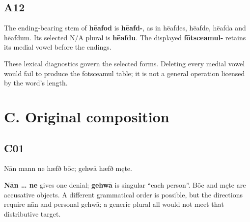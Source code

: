 \subsection*{A12}

\par\begin{minipage}{\linewidth}\raggedright
The ending-bearing stem of \textbf{hēafod} is \textbf{hēafd-}, as in hēafdes, hēafde, hēafda and hēafdum. Its selected N/\allowbreak{}A plural is \textbf{hēafdu}. The displayed \textbf{fōtsceamul-} retains its medial vowel before the endings.

These lexical diagnostics govern the selected forms. Deleting every medial vowel would fail to produce the fōtsceamul table; it is not a general operation licensed by the word’s length.

\end{minipage}\par\addvspace{4pt}

\section*{C. Original composition}

\subsection*{C01}

\par\begin{minipage}{\linewidth}\raggedright
Nān mann ne hæfð bōc; gehwā hæfð męte.

\textbf{Nān … ne} gives one denial; \textbf{gehwā} is singular “each person”. Bōc and męte are accusative objects. A different grammatical order is possible, but the directions require nān and personal gehwā; a generic plural all would not meet that distributive target.

\end{minipage}\par\addvspace{4pt}


